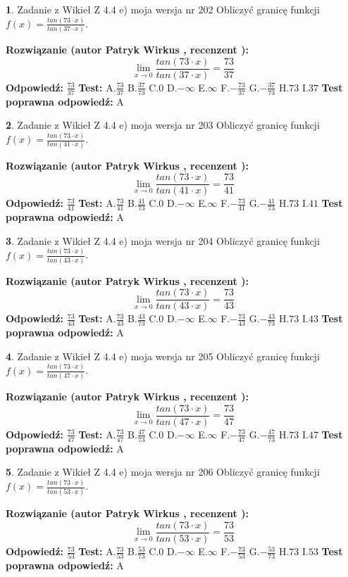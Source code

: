 \documentclass[12pt, a4paper]{article}
\theoremstyle{definition} %
\newtheorem{zad}{}
\newcommand{\zadStart}[1]{\begin{zad}#1\newline}
\newcommand{\zadStop}{\end{zad}}
\newcommand{\rozwStart}[2]{\noindent \textbf{Rozwiązanie (autor #1 , recenzent #2): }\newline}
\newcommand{\rozwStop}{\newline}
\newcommand{\odpStart}{\noindent \textbf{Odpowiedź:}\newline}
\newcommand{\odpStop}{\newline}
\newcommand{\testStart}{\noindent \textbf{Test:}\newline}
\newcommand{\testStop}{\newline}
\newcommand{\kluczStart}{\noindent \textbf{Test poprawna odpowiedź:}\newline}
\newcommand{\kluczStop}{\newline}
\begin{document}
\zadStart{Zadanie z Wikieł Z 4.4 e) moja wersja nr 202}
Obliczyć granicę funkcji $f(x)=\frac{tan(73\cdot x)}{tan(37\cdot x)}$.
\zadStop
\rozwStart{Patryk Wirkus}{}
$$\lim\limits_{x\to 0}\frac{tan(73\cdot x)}{tan(37\cdot x)}=
\frac{73}{37}$$
\rozwStop
\odpStart
$\frac{73}{37}$
\odpStop
\testStart
A.$\frac{73}{37}$
B.$\frac{37}{73}$
C.$0$
D.$-\infty$
E.$\infty$
F.$-\frac{73}{37}$
G.$-\frac{37}{73}$
H.$73$
I.$37$
\testStop
\kluczStart
A
\kluczStop



\zadStart{Zadanie z Wikieł Z 4.4 e) moja wersja nr 203}
Obliczyć granicę funkcji $f(x)=\frac{tan(73\cdot x)}{tan(41\cdot x)}$.
\zadStop
\rozwStart{Patryk Wirkus}{}
$$\lim\limits_{x\to 0}\frac{tan(73\cdot x)}{tan(41\cdot x)}=
\frac{73}{41}$$
\rozwStop
\odpStart
$\frac{73}{41}$
\odpStop
\testStart
A.$\frac{73}{41}$
B.$\frac{41}{73}$
C.$0$
D.$-\infty$
E.$\infty$
F.$-\frac{73}{41}$
G.$-\frac{41}{73}$
H.$73$
I.$41$
\testStop
\kluczStart
A
\kluczStop



\zadStart{Zadanie z Wikieł Z 4.4 e) moja wersja nr 204}
Obliczyć granicę funkcji $f(x)=\frac{tan(73\cdot x)}{tan(43\cdot x)}$.
\zadStop
\rozwStart{Patryk Wirkus}{}
$$\lim\limits_{x\to 0}\frac{tan(73\cdot x)}{tan(43\cdot x)}=
\frac{73}{43}$$
\rozwStop
\odpStart
$\frac{73}{43}$
\odpStop
\testStart
A.$\frac{73}{43}$
B.$\frac{43}{73}$
C.$0$
D.$-\infty$
E.$\infty$
F.$-\frac{73}{43}$
G.$-\frac{43}{73}$
H.$73$
I.$43$
\testStop
\kluczStart
A
\kluczStop



\zadStart{Zadanie z Wikieł Z 4.4 e) moja wersja nr 205}
Obliczyć granicę funkcji $f(x)=\frac{tan(73\cdot x)}{tan(47\cdot x)}$.
\zadStop
\rozwStart{Patryk Wirkus}{}
$$\lim\limits_{x\to 0}\frac{tan(73\cdot x)}{tan(47\cdot x)}=
\frac{73}{47}$$
\rozwStop
\odpStart
$\frac{73}{47}$
\odpStop
\testStart
A.$\frac{73}{47}$
B.$\frac{47}{73}$
C.$0$
D.$-\infty$
E.$\infty$
F.$-\frac{73}{47}$
G.$-\frac{47}{73}$
H.$73$
I.$47$
\testStop
\kluczStart
A
\kluczStop



\zadStart{Zadanie z Wikieł Z 4.4 e) moja wersja nr 206}
Obliczyć granicę funkcji $f(x)=\frac{tan(73\cdot x)}{tan(53\cdot x)}$.
\zadStop
\rozwStart{Patryk Wirkus}{}
$$\lim\limits_{x\to 0}\frac{tan(73\cdot x)}{tan(53\cdot x)}=
\frac{73}{53}$$
\rozwStop
\odpStart
$\frac{73}{53}$
\odpStop
\testStart
A.$\frac{73}{53}$
B.$\frac{53}{73}$
C.$0$
D.$-\infty$
E.$\infty$
F.$-\frac{73}{53}$
G.$-\frac{53}{73}$
H.$73$
I.$53$
\testStop
\kluczStart
A
\kluczStop
\end{document}
